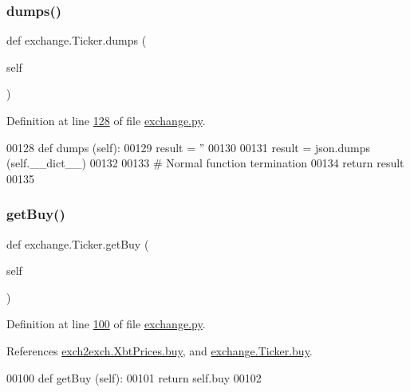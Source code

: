 \subsubsection{\texorpdfstring{dumps()}{dumps()}}
{\footnotesize\ttfamily def exchange.\+Ticker.\+dumps (\begin{DoxyParamCaption}\item[{}]{self }\end{DoxyParamCaption})}



Definition at line \hyperlink{exchange_8py_source_l00128}{128} of file \hyperlink{exchange_8py_source}{exchange.\+py}.


\begin{DoxyCode}
00128     \textcolor{keyword}{def }dumps (self):
00129         result = \textcolor{stringliteral}{''}
00130         
00131         result = json.dumps (self.\_\_dict\_\_)       
00132         
00133         \textcolor{comment}{# Normal function termination}
00134         \textcolor{keywordflow}{return} result
00135     
\end{DoxyCode}
\mbox{\label{classexchange_1_1_ticker_a79d8a00f91a77b91b7126086e4beb569}} 
\subsubsection{\texorpdfstring{get\+Buy()}{getBuy()}}
{\footnotesize\ttfamily def exchange.\+Ticker.\+get\+Buy (\begin{DoxyParamCaption}\item[{}]{self }\end{DoxyParamCaption})}



Definition at line \hyperlink{exchange_8py_source_l00100}{100} of file \hyperlink{exchange_8py_source}{exchange.\+py}.



References \hyperlink{exch2exch_8py_source_l00059}{exch2exch.\+Xbt\+Prices.\+buy}, and \hyperlink{exchange_8py_source_l00060}{exchange.\+Ticker.\+buy}.


\begin{DoxyCode}
00100     \textcolor{keyword}{def }getBuy (self):
00101         \textcolor{keywordflow}{return} self.buy
00102     
\end{DoxyCode}
\mbox{\label{classexchange_1_1_ticker_a11ddd0cbd2eaa9543ed7aec6ec78bcb1}} 
